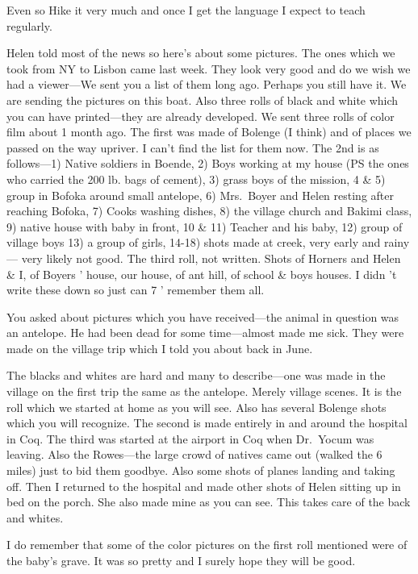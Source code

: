 \documentclass[
]{book}
\begin{document}
Even so Hike it very much and once I get the language I expect to teach regularly.

Helen told most of the news so here's about some pictures. The ones which we took from NY to Lisbon came last week. They look very good and do we wish we had a viewer---We sent you a list of them long ago. Perhaps you still have it. We are sending the pictures on this boat. Also three rolls of black and white which you can have printed---they are already developed. We sent three rolls of color film about 1 month ago. The first was made of Bolenge (I think) and of places we passed on the way upriver. I can't find the list for them now. The 2nd is as follows---1) Native soldiers in Boende, 2) Boys working at my house (PS the ones who carried the 200 lb. bags of cement), 3) grass boys of the mission, 4 \& 5) group in Bofoka around small antelope, 6) Mrs.~Boyer and Helen resting after reaching Bofoka, 7) Cooks washing dishes, 8) the village church and Bakimi class, 9) native house with baby in front, 10 \& 11) Teacher and his baby, 12) group of village boys 13) a group of girls, 14-18) shots made at creek, very early and rainy--- very likely not good. The third roll, not written. Shots of Horners and Helen \& I, of Boyers ' house, our house, of ant hill, of school \& boys houses. I didn 't write these down so just can 7 ' remember them all.

You asked about pictures which you have received---the animal in question was an antelope. He had been dead for some time---almost made me sick. They were made on the village trip which I told you about back in June.

The blacks and whites are hard and many to describe---one was made in the village on the first trip the same as the antelope. Merely village scenes. It is the roll which we started at home as you will see. Also has several Bolenge shots which you will recognize. The second is made entirely in and around the hospital in Coq. The third was started at the airport in Coq when Dr.~Yocum was leaving. Also the Rowes---the large crowd of natives came out (walked the 6 miles) just to bid them goodbye. Also some shots of planes landing and taking off. Then I returned to the hospital and made other shots of Helen sitting up in bed on the porch. She also made mine as you can see. This takes care of the back and whites.

I do remember that some of the color pictures on the first roll mentioned were of the baby's grave. It was so pretty and I surely hope they will be good.
\end{document}

